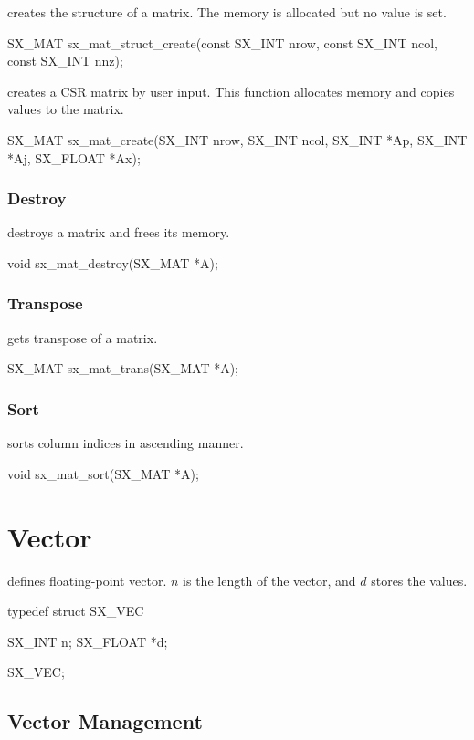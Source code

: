  creates the structure of a matrix. The memory is allocated
but no value is set.
\begin{evb}
SX_MAT sx_mat_struct_create(const SX_INT nrow, const SX_INT ncol, const SX_INT nnz);
\end{evb}

 creates a CSR matrix by user input. This function allocates memory
and copies values to the matrix.
\begin{evb}
SX_MAT sx_mat_create(SX_INT nrow, SX_INT ncol, SX_INT *Ap, SX_INT *Aj, SX_FLOAT *Ax);
\end{evb}

\subsubsection{Destroy}
 destroys a matrix and frees its memory.
\begin{evb}
void sx_mat_destroy(SX_MAT *A);
\end{evb}

\subsubsection{Transpose}
 gets transpose of a matrix.
\begin{evb}
SX_MAT sx_mat_trans(SX_MAT *A);
\end{evb}

\subsubsection{Sort}
 sorts column indices in ascending manner.
\begin{evb}
void sx_mat_sort(SX_MAT *A);
\end{evb}

\section{Vector}

 defines floating-point vector. {\color{blue} $n$} is the length of the vector, and 
{\color{blue} $d$} stores the values.
\begin{evb}
typedef struct SX_VEC 
{
    SX_INT   n;
    SX_FLOAT *d;

} SX_VEC;
\end{evb}

\subsection{Vector Management}


